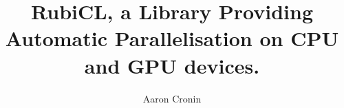 \title{RubiCL, a Library Providing Automatic Parallelisation on CPU and GPU devices.}

\author{Aaron Cronin}


